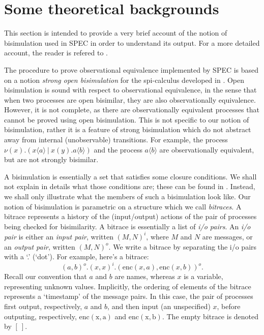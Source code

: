 \documentclass{article}
\begin{document}
\section{Some theoretical backgrounds}
\label{sec:theory}

This section is intended to provide a very brief account of the notion of bisimulation used in SPEC in
order to understand its output. For a more detailed account, the reader is refered to \cite{tiu07aplas,tiu09corr}.

The procedure to prove observational equivalence implemented by SPEC is based on a notion 
{\em strong open bisimulation} for the spi-calculus developed in \cite{tiu07aplas}. Open bisimulation is sound
with respect to observational equivalence, in the sense that when two processes are
open bisimilar, they are also observationally equivalence. However, it is not complete,
as there are observationally equivalent processes that cannot be proved using open bisimulation.
This is not specific to our notion of bisimulation, rather it is a feature of 
strong bisimulation which do not abstract away from internal (unobservable) transitions.
For example, the process $\nu (x).(x\langle a \rangle ~|~ x(y).a\langle b \rangle)$
and the process $a\langle b \rangle$ are observationally equivalent, but are not strongly
bisimilar. 

A bisimulation is essentially a set that satisfies some closure conditions. We shall not 
explain in details what those conditions are; these can be found in \cite{tiu09corr,tiu10csf}.
Instead, we shall only illustrate what the members of such a bisimulation look like. 
Our notion of bisimulation is parametric on a structure which we call {\em bitraces}.
A bitrace represents a history of the (input/output) actions of the pair of processes being checked for 
bisimilarity. A bitrace is essentially a list of {\em i/o pairs}. 
An {\em i/o pair} is either an {\em input pair}, written $(M,N)^i$, where $M$ and $N$ are messages,
or an {\em output pair}, written $(M,N)^o.$
We write a bitrace by separating the i/o pairs with a `.' (`dot'). For example, here's a bitrace:
$$
(a,b)^o.(x,x)^i.(\mathrm{enc}(x,a), \mathrm{enc}(x,b))^o.
$$
Recall our convention that $a$ and $b$ are names, whereas $x$ is a variable, representing unknown values. 
Implicitly, the ordering of elements of the bitrace represents a `timestamp' of the message pairs. 
In this case, the pair of processes first output, respectively, $a$ and $b$, and then input
(an unspecified) $x$, before outputing, respectively, $\mathrm{enc(x,a)}$ and $\mathrm{enc(x,b)}$. 
The empty bitrace is denoted by $[~].$
\end{document}
